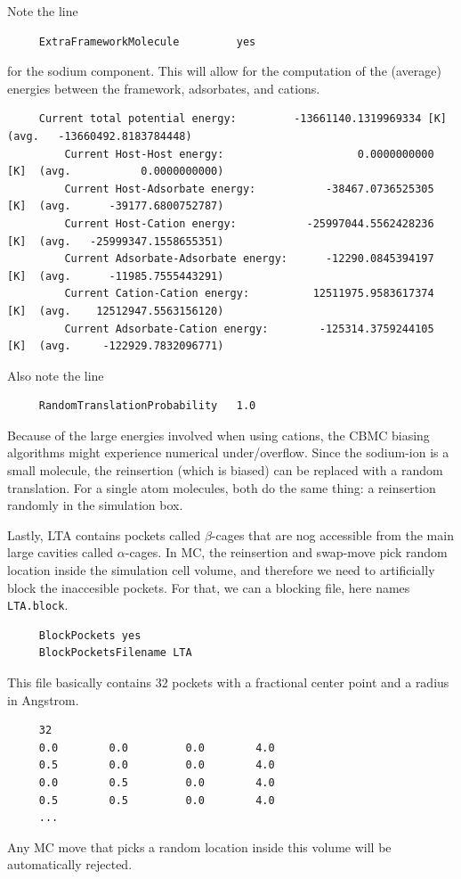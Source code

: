 \noindent
Note the line
\begin{tiny}
\begin{verbatim}
     ExtraFrameworkMolecule         yes
\end{verbatim}
\end{tiny}
for the sodium component. This will allow for the computation of the (average) energies between the framework, adsorbates, and cations.
\begin{tiny}
\begin{verbatim}
     Current total potential energy:         -13661140.1319969334 [K]  (avg.   -13660492.8183784448)
         Current Host-Host energy:                     0.0000000000 [K]  (avg.           0.0000000000)
         Current Host-Adsorbate energy:           -38467.0736525305 [K]  (avg.      -39177.6800752787)
         Current Host-Cation energy:           -25997044.5562428236 [K]  (avg.   -25999347.1558655351)
         Current Adsorbate-Adsorbate energy:      -12290.0845394197 [K]  (avg.      -11985.7555443291)
         Current Cation-Cation energy:          12511975.9583617374 [K]  (avg.    12512947.5563156120)
         Current Adsorbate-Cation energy:        -125314.3759244105 [K]  (avg.     -122929.7832096771)
\end{verbatim}
\end{tiny}
Also note the line
\begin{tiny}
\begin{verbatim}
     RandomTranslationProbability   1.0
\end{verbatim}
\end{tiny}
Because of the large energies involved when using cations, the CBMC biasing algorithms might experience numerical under/overflow.
Since the sodium-ion is a small molecule, the reinsertion (which is biased) can be replaced with a random translation.
For a single atom molecules, both do the same thing: a reinsertion randomly in the simulation box.

\noindent
Lastly, LTA contains pockets called $\beta$-cages that are nog accessible from the main large cavities called $\alpha$-cages.
In MC, the reinsertion and swap-move pick random location inside the simulation cell volume, and therefore we need to artificially block
the inaccesible pockets. For that, we can a blocking file, here names \verb+LTA.block+.
\begin{tiny}
\begin{verbatim}
     BlockPockets yes 
     BlockPocketsFilename LTA
\end{verbatim}
This file basically contains 32 pockets with a fractional center point and a radius in Angstrom.
\end{tiny}
\begin{tiny}
\begin{verbatim}
     32
     0.0        0.0         0.0        4.0
     0.5        0.0         0.0        4.0
     0.0        0.5         0.0        4.0
     0.5        0.5         0.0        4.0
     ...
\end{verbatim}
\end{tiny}
Any MC move that picks a random location inside this volume will be automatically rejected.

